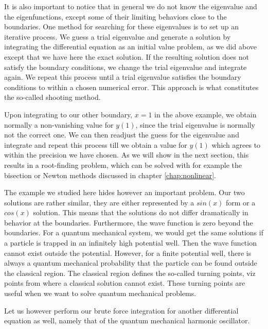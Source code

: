 It is also important to notice that in general we do not know the eigenvalue and the eigenfunctions,
except some of their limiting behaviors close to the boundaries.  One method for searching for these
eigenvalues is to set up an iterative process. We guess a trial eigenvalue and generate 
a solution by integrating the differential equation as an initial value problem, as we did above
except that we have here the exact solution. 
If the resulting solution does not satisfy the boundary conditions, we change the trial eigenvalue
and integrate again. We repeat this process until a trial eigenvalue satisfies the boundary
conditions to within a chosen numerical error. This approach is what constitutes the so-called
shooting method.

Upon integrating to our other boundary, $x=1$ in the above example, we obtain normally a non-vanishing 
value for $y(1)$, since the trial eigenvalue is normally not the correct one. 
We can then readjust the guess for the eigenvalue and integrate and repeat this process till we obtain
a value for $y(1)$ which agrees to within the precision we have chosen. As we will show in the next section,
this results in a root-finding problem, which can be solved with for example the bisection or Newton methods
discussed in chapter \ref{chap:nonlinear}. 

The example we studied here hides however an important problem. Our two solutions are rather similar,
they are either represented by a  $sin(x)$ form or a $cos(x)$ solution. 
This means that the solutions do not differ dramatically in behavior at the 
boundaries. Furthermore, the wave function is zero beyond the boundaries. 
For a quantum mechanical system, we would get the same solutions if a particle is trapped in an 
infinitely high potential well. Then the wave function cannot exist outside the potential.
However, for a finite potential well, there is always a quantum mechanical probability that the 
particle can be found outside the classical region. The classical region defines the so-called turning points,
viz points from where a classical solution cannot exist. 
These turning points are useful when we want to solve quantum mechanical problems.

Let us however perform our brute force integration for another differential equation as well, namely that
of the quantum mechanical harmonic oscillator.

